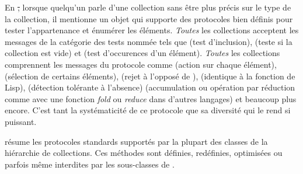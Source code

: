 \documentclass[a4paper,10pt,twoside]{book}
\begin{document}
En \st, lorsque quelqu'un parle d'une collection sans \^etre plus pr\'ecis
sur le type de la collection, il mentionne un objet qui supporte des protocoles
bien d\'efinis pour tester l'appartenance et \'enum\'erer les \'el\'ements.
\emph{Toutes} les collections acceptent les messages 
de la cat\'egorie des tests nomm\'ee  tels que \mbox{} (test d'inclusion),  (teste si la collection est vide) 
et \mbox{} (test d'occurences d'un \'el\'ement). 
\emph{Toutes} les collections comprennent les messages du protocole 
 comme 
 (action sur chaque \'el\'ement), 
 (s\'election de certains \'el\'ements), 
 (rejet \`a l'oppos\'e de ), 
 (identique \`a la fonction  de Lisp),
 (d\'etection tol\'erante \`a l'absence) 
 (accumulation ou op\'eration par r\'eduction 
comme avec une fonction \emph{fold} ou \emph{reduce} dans d'autres langages) et
beaucoup plus encore.
C'est tant la systématicité de ce protocole que sa diversit\'e qui le rend
si puissant.

 r\'esume les protocoles standards support\'es par la
plupart des classes de la hi\'erarchie de collections. 
Ces m\'ethodes sont d\'efinies, red\'efinies, optimis\'ees ou parfois
m\^eme interdites par les sous-classes de 
.
\end{document}
